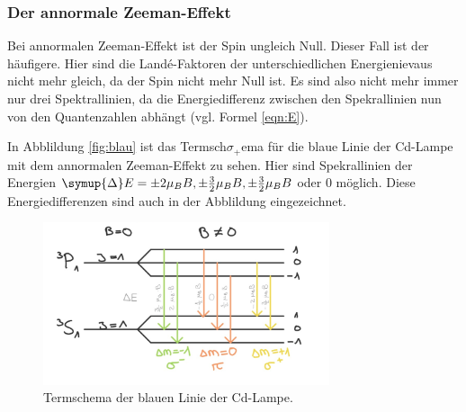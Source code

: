 \subsubsection{Der annormale Zeeman-Effekt}

Bei annormalen Zeeman-Effekt ist der Spin ungleich Null. Dieser Fall ist der häufigere.
Hier sind die Landé-Faktoren der unterschiedlichen Energienievaus nicht mehr gleich, da der Spin nicht mehr Null ist. 
Es sind also nicht mehr immer nur drei Spektrallinien, da die Energiedifferenz zwischen den 
Spekrallinien nun von den Quantenzahlen abhängt (vgl. Formel \ref{eqn:E}). 

In Abblildung \ref{fig:blau} ist das Termsch$\sigma_{+}$ema für die blaue Linie der Cd-Lampe mit dem annormalen 
Zeeman-Effekt zu sehen. Hier sind Spekrallinien der Energien $\symup{\Delta}E = \pm 2 \mu_B B, \pm \frac{3}{2} \mu_B B, \pm \frac{3}{2} \mu_B B$ 
oder $0$ möglich. Diese Energiedifferenzen sind auch in der Abblildung eingezeichnet.

\begin{figure}
  \centering
  \includegraphics[width=0.75\textwidth]{blau2.png}
  \caption{Termschema der blauen Linie der Cd-Lampe.}
  \label{fig:rot}
\end{figure}
\FloatBarrier

